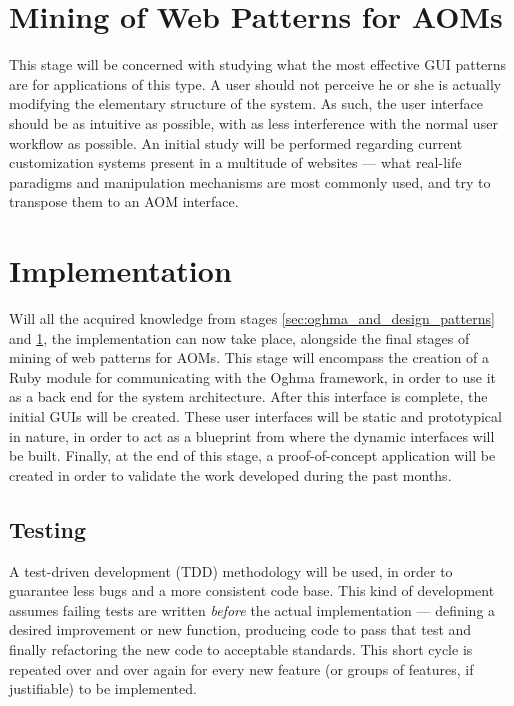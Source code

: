 \section{Mining of Web Patterns for AOMs}\label{sec:mining_of_web_patterns}

This stage will be concerned with studying what the most effective GUI patterns are for applications of this type. A user should not perceive he or she is actually modifying the elementary structure of the system. As such, the user interface should be as intuitive as possible, with as less interference with the normal user workflow as possible. An initial study will be performed regarding current customization systems present in a multitude of websites --- what real-life paradigms and manipulation mechanisms are most commonly used, and try to transpose them to an AOM interface.

\section{Implementation}\label{sec:implementation}

Will all the acquired knowledge from stages \ref{sec:oghma_and_design_patterns} and \ref{sec:mining_of_web_patterns}, the implementation can now take place, alongside the final stages of mining of web patterns for AOMs. This stage will encompass the creation of a Ruby module for communicating with the Oghma framework, in order to use it as a back end for the system architecture. After this interface is complete, the initial GUIs will be created. These user interfaces will be static and prototypical in nature, in order to act as a blueprint from where the dynamic interfaces will be built. Finally, at the end of this stage, a proof-of-concept application will be created in order to validate the work developed during the past months.

\subsection{Testing}\label{sec:testing}

A test-driven development (TDD) methodology will be used, in order to guarantee less bugs and a more consistent code base. This kind of development assumes failing tests are written \emph{before} the actual implementation --- defining a desired improvement or new function, producing code to pass that test and finally refactoring the new code to acceptable standards. This short cycle is repeated over and over again for every new feature (or groups of features, if justifiable) to be implemented.

